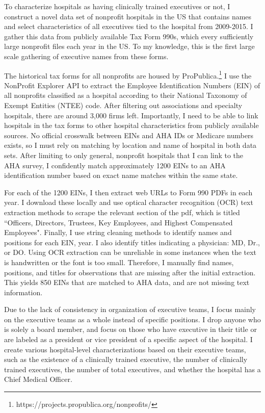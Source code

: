 \documentclass[12pt]{article}
\begin{document}
    To characterize hospitals as having clinically trained executives or not, I construct a novel data set of nonprofit hospitals in the US that contains names and select characteristics of all executives tied to the hospital from 2009-2015. I gather this data from publicly available Tax Form 990s, which every sufficiently large nonprofit files each year in the US. To my knowledge, this is the first large scale gathering of executive names from these forms. 

    The historical tax forms for all nonprofits are housed by ProPublica.\footnote{https://projects.propublica.org/nonprofits/} I use the NonProfit Explorer API to extract the Employee Identification Numbers (EIN) of all nonprofits classified as a hospital according to their National Taxonomy of Exempt Entities (NTEE) code. After filtering out associations and specialty hospitals, there are around 3,000 firms left. Importantly, I need to be able to link hospitals in the tax forms to other hospital characteristics from publicly available sources. No official crosswalk between EINs and AHA IDs or Medicare numbers exists, so I must rely on matching by location and name of hospital in both data sets. After limiting to only general, nonprofit hospitals that I can link to the AHA survey, I confidently match approximately 1200 EINs to an AHA identification number based on exact name matches within the same state. 
    
    For each of the 1200 EINs, I then extract web URLs to Form 990 PDFs in each year. I download these locally and use optical character recognition (OCR) text extraction methods to scrape the relevant section of the pdf, which is titled ``Officers, Directors, Trustees, Key Employees, and Highest Compensated Employees". Finally, I use string cleaning methods to identify names and positions for each EIN, year. I also identify titles indicating a physician: MD, Dr., or DO. Using OCR extraction can be unreliable in some instances when the text is handwritten or the font is too small. Therefore, I manually find names, positions, and titles for observations that are missing after the initial extraction. This yields 850 EINs that are matched to AHA data, and are not missing text information. 

    Due to the lack of consistency in organization of executive teams, I focus mainly on the executive teams as a whole instead of specific positions. I drop anyone who is solely a board member, and focus on those who have executive in their title or are labeled as a president or vice president of a specific aspect of the hospital. I create various hospital-level characterizations based on their executive teams, such as the existence of a clinically trained executive, the number of clinically trained executives, the number of total executives, and whether the hospital has a Chief Medical Officer.
\end{document}
